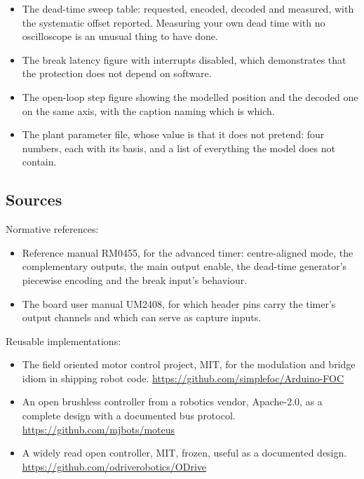 \begin{itemize}
\item The dead-time sweep table: requested, encoded, decoded and measured, with
the systematic offset reported. Measuring your own dead time with no
oscilloscope is an unusual thing to have done.
\item The break latency figure with interrupts disabled, which demonstrates that
the protection does not depend on software.
\item The open-loop step figure showing the modelled position and the decoded
one on the same axis, with the caption naming which is which.
\item The plant parameter file, whose value is that it does not pretend: four
numbers, each with its basis, and a list of everything the model does not
contain.
\end{itemize}

\subsection*{Sources}

Normative references:
\begin{itemize}
\item Reference manual RM0455, for the advanced timer: centre-aligned mode, the
complementary outputs, the main output enable, the dead-time generator's
piecewise encoding and the break input's behaviour.
\item The board user manual UM2408, for which header pins carry the timer's
output channels and which can serve as capture inputs.
\end{itemize}

Reusable implementations:
\begin{itemize}
\item The field oriented motor control project, MIT, for the modulation and
bridge idiom in shipping robot code.\newline
\url{https://github.com/simplefoc/Arduino-FOC}
\item An open brushless controller from a robotics vendor, Apache-2.0, as a
complete design with a documented bus protocol.\newline
\url{https://github.com/mjbots/moteus}
\item A widely read open controller, MIT, frozen, useful as a documented
design.\newline
\url{https://github.com/odriverobotics/ODrive}
\end{itemize}
